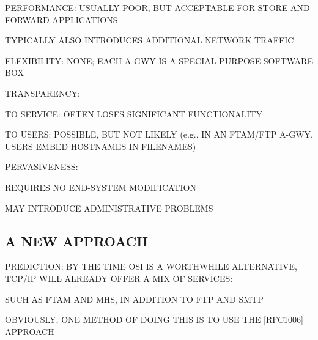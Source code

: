 \begin{bwslide}

\begin{nrtc}
\item	PERFORMANCE: USUALLY POOR, BUT ACCEPTABLE FOR STORE-AND-FORWARD
	APPLICATIONS
    \begin{nrtc}
    \item	TYPICALLY ALSO INTRODUCES ADDITIONAL NETWORK TRAFFIC
    \end{nrtc}

\item	FLEXIBILITY: NONE; EACH A-GWY IS A SPECIAL-PURPOSE SOFTWARE BOX


\item	TRANSPARENCY: 
    \begin{nrtc}
    \item	TO SERVICE: OFTEN LOSES SIGNIFICANT FUNCTIONALITY

    \item	TO USERS: POSSIBLE, BUT NOT LIKELY (e.g., IN AN FTAM/FTP A-GWY,
		USERS EMBED HOSTNAMES IN FILENAMES)
    \end{nrtc}

\item	PERVASIVENESS:
    \begin{nrtc}
    \item	REQUIRES NO END-SYSTEM MODIFICATION

    \item	MAY INTRODUCE ADMINISTRATIVE PROBLEMS
    \end{nrtc}
\end{nrtc}
\end{bwslide}


\begin{bwslide}
\part*	{A NEW APPROACH}\bf

\begin{nrtc}
\item	PREDICTION: BY THE TIME OSI IS A WORTHWHILE ALTERNATIVE,
	TCP/IP WILL ALREADY OFFER A MIX OF SERVICES:
    \begin{nrtc}
    \item	SUCH AS FTAM AND MHS, IN ADDITION TO FTP AND SMTP
    \end{nrtc}

\item	OBVIOUSLY, ONE METHOD OF DOING THIS IS TO USE THE [RFC1006] APPROACH
\end{nrtc}
\end{bwslide}


